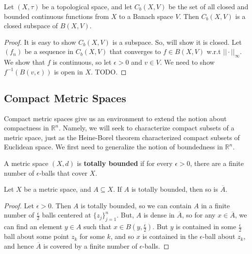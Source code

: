 	\begin{prop}
		Let $(X, \tau)$ be a topological space, and let $C_b(X, V)$ be the set of all closed and bounded continuous 
		functions from $X$ to a Banach space $V$. Then $C_b(X, V)$ is a closed subspace of $B(X, V)$. 
	\end{prop}
	
	\begin{proof}
		It is easy to show $C_b(X, V)$ is a subspace. So, will show it is closed. Let $(f_n)$ be a sequence in 
		$C_b(X, V)$ that converges to $f\in B(X, V)$ w.r.t $||\cdot||_\infty$. We show that $f$ is continuous, so let 
		$\epsilon > 0$ and $v\in V$. We need to show $f^{-1}(B(v, \epsilon))$ is open in $X$. TODO.
	\end{proof}
	
\subsection{Compact Metric Spaces}

	Compact metric spaces give us an environment to extend the notion about compactness in $\mathbb R^n$. Namely, 
	we will seek to characterize compact subsets of a metric space, just as the Heine-Borel theorem characterized 
	compact subsets of Euclidean space. We first need to generalize the notion of boundedness in $\mathbb R^n$.
	
	\begin{definition}
		A metric space $(X, d)$ is \textbf{totally bounded} if for every $\epsilon > 0$, there are a finite number of 
		$\epsilon$-balls that cover $X$.
	\end{definition}
	
	\begin{prop}
		Let $X$ be a metric space, and $A\subseteq X$. If $A$ is totally bounded, then so is $\overline A$. 
	\end{prop}
	
	\begin{proof}
		Let $\epsilon > 0$. Then $A$ is totally bounded, so we can contain $A$ in a finite number of $\frac{\epsilon}{2}$ 
		balls centered at $\{z_j\}_{j = 1}^n$. But, $A$ is dense in $\overline A$, so for any $x\in\overline A$, we can find an 
		element $y\in A$ such that $x\in B(y, \frac{\epsilon}{2})$. But $y$ is contained in some $\frac{\epsilon}{2}$ ball about 
		some point $z_k$ for some $k$, and so $x$ is contained in the $\epsilon$-ball about $z_k$, and hence $\overline 
		A$ is covered by a finite number of $\epsilon$-balls.
	\end{proof}
	
